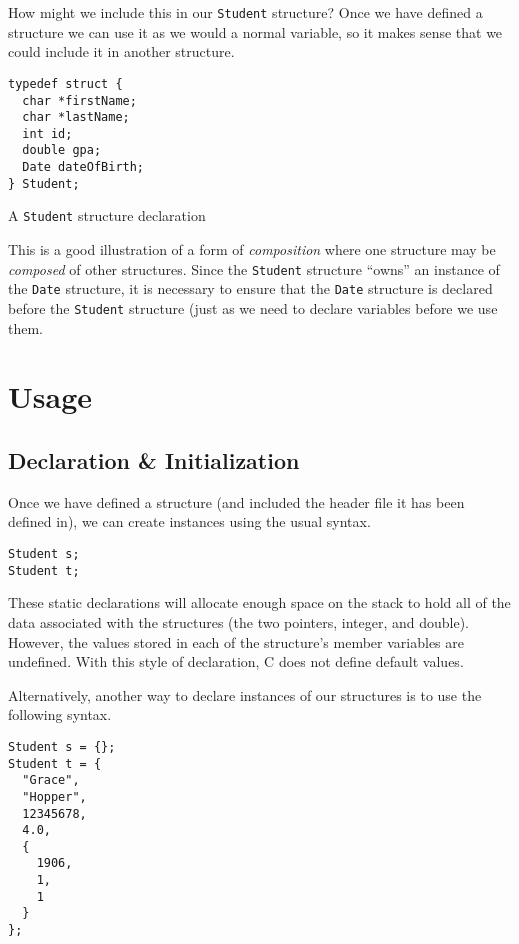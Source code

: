 How might we include this in our \texttt{Student} structure?
Once we have defined a structure we can use it as we would a normal
variable, so it makes sense that we could include it in another structure.

\begin{listing}
\centering
\begin{verbatim}
typedef struct {
  char *firstName;
  char *lastName;
  int id;
  double gpa;
  Date dateOfBirth;
} Student;
\end{verbatim}
\caption{A \texttt{Student} structure declaration}
\label{code:c:studentStructure}
\end{listing}

This is a good illustration of a form of \emph{composition} where 
one structure may be \emph{composed} of other structures.  Since
the \texttt{Student} structure ``owns'' an instance of the
\texttt{Date} structure, it is necessary to ensure that 
the \texttt{Date} structure is declared before the 
\texttt{Student} structure (just as we need to declare 
variables before we use them.

\section{Usage}

\subsection{Declaration \& Initialization}

Once we have defined a structure (and included the header file
it has been defined in), we can create instances using the usual
syntax.

\begin{verbatim}
Student s;
Student t;
\end{verbatim}

These static declarations will allocate enough space on the stack
to hold all of the data associated with the structures (the two
pointers, integer, and double).  However, the values stored in 
each of the structure's member variables are undefined.  With
this style of declaration, C does not define default values.

Alternatively, another way to declare instances of our structures
is to use the following syntax.

\begin{verbatim}
Student s = {};
Student t = {
  "Grace",
  "Hopper",
  12345678,
  4.0,
  {
    1906,
    1,
    1
  }
};
\end{verbatim}

